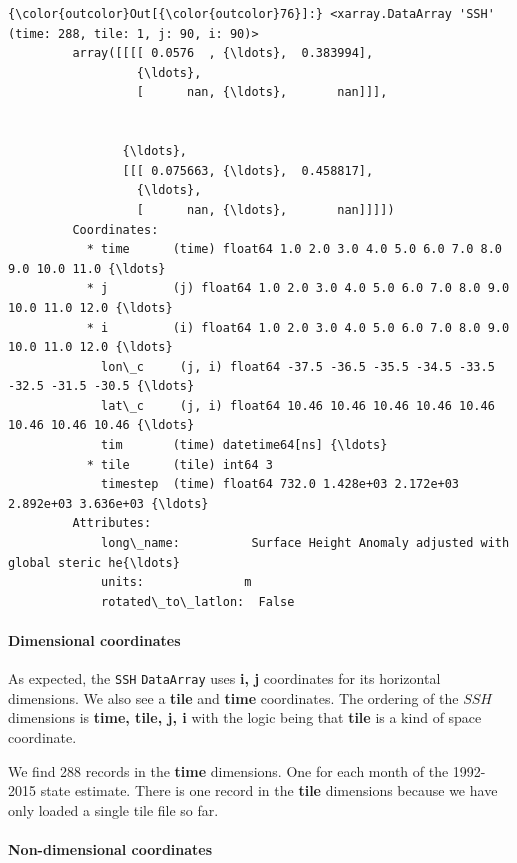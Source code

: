 \documentclass[11pt]{article}
\begin{document}
\begin{Verbatim}[commandchars=\\\{\}]
{\color{outcolor}Out[{\color{outcolor}76}]:} <xarray.DataArray 'SSH' (time: 288, tile: 1, j: 90, i: 90)>
         array([[[[ 0.0576  , {\ldots},  0.383994],
                  {\ldots}, 
                  [      nan, {\ldots},       nan]]],
         
         
                {\ldots}, 
                [[[ 0.075663, {\ldots},  0.458817],
                  {\ldots}, 
                  [      nan, {\ldots},       nan]]]])
         Coordinates:
           * time      (time) float64 1.0 2.0 3.0 4.0 5.0 6.0 7.0 8.0 9.0 10.0 11.0 {\ldots}
           * j         (j) float64 1.0 2.0 3.0 4.0 5.0 6.0 7.0 8.0 9.0 10.0 11.0 12.0 {\ldots}
           * i         (i) float64 1.0 2.0 3.0 4.0 5.0 6.0 7.0 8.0 9.0 10.0 11.0 12.0 {\ldots}
             lon\_c     (j, i) float64 -37.5 -36.5 -35.5 -34.5 -33.5 -32.5 -31.5 -30.5 {\ldots}
             lat\_c     (j, i) float64 10.46 10.46 10.46 10.46 10.46 10.46 10.46 10.46 {\ldots}
             tim       (time) datetime64[ns] {\ldots}
           * tile      (tile) int64 3
             timestep  (time) float64 732.0 1.428e+03 2.172e+03 2.892e+03 3.636e+03 {\ldots}
         Attributes:
             long\_name:          Surface Height Anomaly adjusted with global steric he{\ldots}
             units:              m
             rotated\_to\_latlon:  False
\end{Verbatim}
            
    \paragraph{Dimensional coordinates}\label{dimensional-coordinates}

As expected, the \texttt{SSH} \texttt{DataArray} uses \textbf{i, j}
coordinates for its horizontal dimensions. We also see a \textbf{tile}
and \textbf{time} coordinates. The ordering of the \(SSH\) dimensions is
\textbf{time, tile, j, i} with the logic being that \textbf{tile} is a
kind of space coordinate.

We find 288 records in the \textbf{time} dimensions. One for each month
of the 1992-2015 state estimate. There is one record in the
\textbf{tile} dimensions because we have only loaded a single tile file
so far.

\paragraph{Non-dimensional
coordinates}\label{non-dimensional-coordinates}
\end{document}
